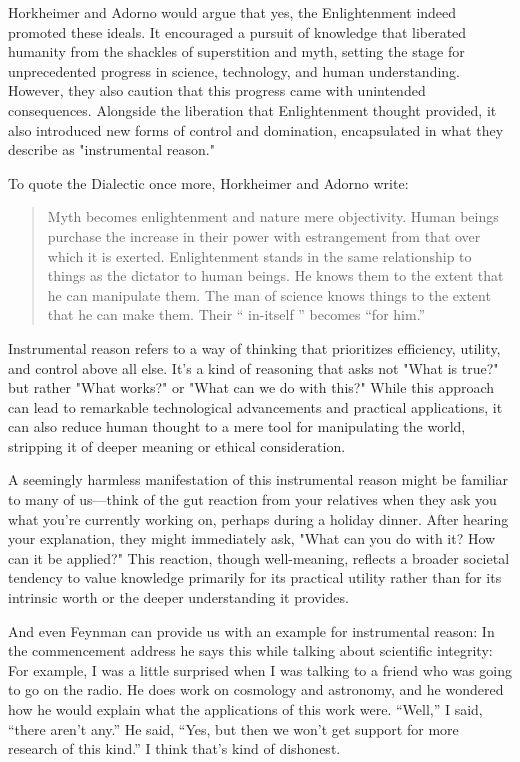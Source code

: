 Horkheimer and Adorno would argue that yes, the Enlightenment indeed promoted
these ideals. It encouraged a pursuit of knowledge that liberated humanity from
the shackles of superstition and myth, setting the stage for unprecedented
progress in science, technology, and human understanding. However, they also
caution that this progress came with unintended consequences. Alongside the
liberation that Enlightenment thought provided, it also introduced new forms of
control and domination, encapsulated in what they describe as "instrumental
reason."

To quote the Dialectic once more, Horkheimer and Adorno write: 
\blockquote{
  Myth becomes enlightenment and nature mere objectivity. Human
beings purchase the increase in their power with estrangement from that
over which it is exerted. Enlightenment stands in the same relationship to
things as the dictator to human beings. He knows them to the extent that
he can manipulate them. The man of science knows things to the extent
that he can make them. Their “ in-itself ” becomes “for him.”
}

Instrumental reason refers to a way of thinking that prioritizes efficiency,
utility, and control above all else. It’s a kind of reasoning that asks not
"What is true?" but rather "What works?" or "What can we do with this?" While
this approach can lead to remarkable technological advancements and practical
applications, it can also reduce human thought to a mere tool for manipulating
the world, stripping it of deeper meaning or ethical consideration.

A seemingly harmless manifestation of this instrumental reason might be
familiar to many of us—think of the gut reaction from your relatives when they
ask you what you’re currently working on, perhaps during a holiday dinner.
After hearing your explanation, they might immediately ask, "What can you do
with it? How can it be applied?" This reaction, though well-meaning, reflects a
broader societal tendency to value knowledge primarily for its practical
utility rather than for its intrinsic worth or the deeper understanding it
provides.

And even Feynman can provide us with an example for instrumental reason: In the
commencement address he says this while talking about scientific integrity: For
example, I was a little surprised when I was talking to a friend who was going
to go on the radio. He does work on cosmology and astronomy, and he wondered
how he would explain what the applications of this work were. \enquote{Well,}
I said, \enquote{there aren't any.} He said, \enquote{Yes, but then we won't
get support for more research of this kind.} I think that's kind of dishonest.

